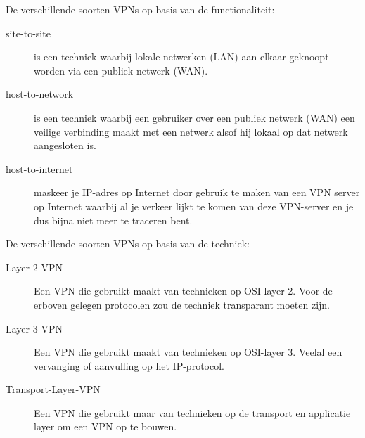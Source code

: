 De verschillende soorten VPNs op basis van de functionaliteit:
\begin{description}
\item[site-to-site] is een techniek waarbij lokale netwerken (LAN) aan elkaar geknoopt worden via een publiek netwerk (WAN).
\item[host-to-network] is een techniek waarbij een gebruiker over een publiek netwerk (WAN) een veilige verbinding maakt met een netwerk alsof hij lokaal op dat netwerk aangesloten is.
\item[host-to-internet] maskeer je IP-adres op Internet door gebruik te maken van een VPN server op Internet waarbij al je verkeer lijkt te komen van deze VPN-server en je dus bijna niet meer te traceren bent.
\end{description}

De verschillende soorten VPNs op basis van de techniek:
\begin{description}
\item[Layer-2-VPN] Een VPN die gebruikt maakt van technieken op OSI-layer 2. Voor de erboven gelegen protocolen zou de techniek transparant moeten zijn.
\item[Layer-3-VPN] Een VPN die gebruikt maakt van technieken op OSI-layer 3. Veelal een vervanging of aanvulling op het IP-protocol.
\item[Transport-Layer-VPN] Een VPN die gebruikt maar van technieken op de transport en applicatie layer om een VPN op te bouwen.
\end{description}
